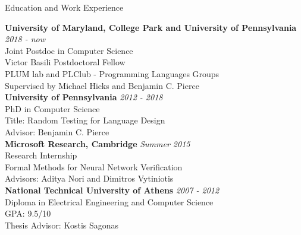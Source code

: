 \documentclass{resume} %
\begin{document}

\newcommand{\edu}[4]{
  {\bf #3} \hfill {\em #2}\\
  {#1}\\
  #4\\
}

\begin{rSection}{Education and Work Experience}

\edu{Joint Postdoc in Computer Science}{2018 - now}
    {University of Maryland, College Park and University of Pennsylvania}{
      Victor Basili Postdoctoral Fellow\\
      PLUM lab and PLClub - Programming Languages Groups\\
      Supervised by Michael Hicks and Benjamin C. Pierce
    }
% 

\edu{PhD in Computer Science}{2012 - 2018}
    {University of Pennsylvania}{
      Title: Random Testing for Language Design\\
      Advisor: Benjamin C. Pierce
    }
    
\edu{Research Internship}{Summer 2015}
    {Microsoft Research, Cambridge}{
      Formal Methods for Neural Network Verification\\
      Advisors: Aditya Nori and Dimitros Vytiniotis
    }

\edu{Diploma in Electrical Engineering and Computer Science}{2007 - 2012}
    {National Technical University of Athens}
    {
      GPA: 9.5/10\\
      Thesis Advisor: Kostis Sagonas
     }

%    
\end{rSection}


\newcommand{\Catalin}{C\u{a}t\u{a}lin\xspace}
\newcommand{\Hritcu}{Hri\c{t}cu\xspace}
\newcommand{\Denes}{D\'en\`es\xspace}
\end{document}
